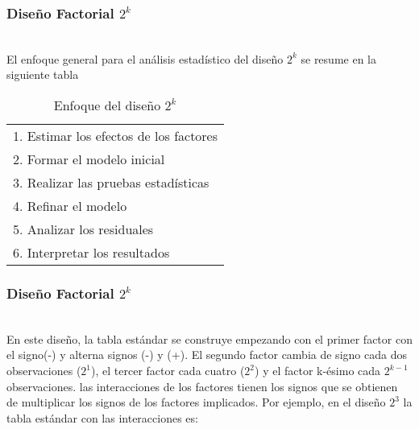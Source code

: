\documentclass[12pt]{beamer}
\begin{document}
\begin{frame}
\frametitle{Diseño Factorial $ 2^{k} $}

~\\El enfoque general para el análisis estadístico del diseño $2^k$ se resume en la siguiente tabla
\begin{table}[htbp]
  \centering
  \caption{Enfoque del diseño  $ 2^{k} $}
  \resizebox{0.7\textwidth}{!} {
\begin{tabular}{l}
\hline 
1. Estimar los efectos de los factores\\
2. Formar el modelo inicial\\
3. Realizar las pruebas estadísticas\\
4. Refinar el modelo\\
5. Analizar los residuales\\
6. Interpretar los resultados\\
\hline 
\end{tabular}
}
\label{tab:addlabel}%
\end{table}%
\end{frame}

\begin{frame}
\frametitle{Diseño Factorial $ 2^{k} $}
~\\En este diseño, la tabla estándar se construye empezando con el primer factor con el signo(-) y alterna signos (-) y (+). El segundo factor cambia de signo cada dos observaciones ($2^1$), el tercer factor cada cuatro ($2^2$) y el factor k-ésimo cada $2^{k-1}$ observaciones. las interacciones de los factores tienen los signos que se obtienen de multiplicar los signos de los factores implicados. Por ejemplo, en el diseño $2^3$ la tabla estándar con las interacciones es:
\end{frame}
\end{document}

